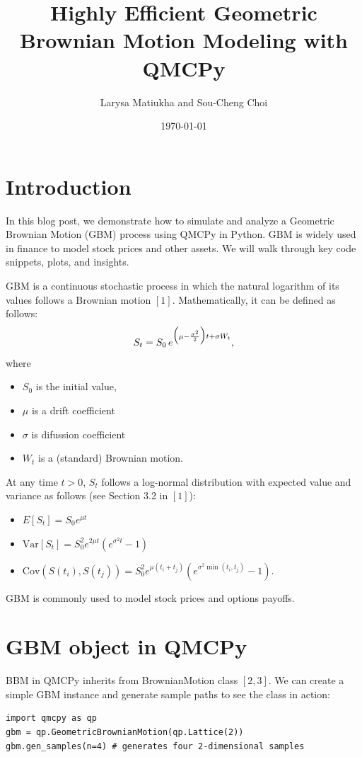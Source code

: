 \documentclass{article}
\title{Highly Efficient Geometric Brownian Motion Modeling with QMCPy}
\author{Larysa Matiukha and Sou-Cheng Choi}
\date{\today}
\begin{document}
\maketitle

\section{Introduction}

In this blog post, we demonstrate how to simulate and analyze a Geometric Brownian Motion (GBM) process using QMCPy in Python.
GBM is widely used in finance to model stock prices and other assets. 
We will walk through key code snippets, plots, and insights.

GBM is a continuous stochastic process in which the natural logarithm of its values follows a Brownian motion $[1]$.
Mathematically, it can be defined as follows:
$$\large{S_t = S_0 \, e^{\big(\mu - \frac{\sigma^2}{2}\big)  t + \sigma W_t}}, \label{gbm}$$
where
\begin{itemize}
\item $S_0$ is the initial value, 
\item $\mu$ is a drift coefficient
\item  $\sigma$ is difussion coefficient  
\item  $W_t$ is a (standard) Brownian motion.
\end{itemize}

At any time $t > 0$, $S_t$ follows a log-normal distribution with expected value and variance as follows (see Section 3.2 in $[1]$):
\begin{itemize}
\item
 $E[S_t] = S_0 e^{\mu t}$
\item $\text{Var}[S_t] = S_0^2 e^{2\mu t}(e^{\sigma^2 t} - 1)$
\item   $  
    \text{Cov}(S(t_i), S(t_j)) = S_0^2 e^{\mu(t_i + t_j)} \left(e^{\sigma^2 \min(t_i, t_j)} - 1\right).$
\end{itemize}


GBM is commonly used to model stock prices and options payoffs. 

\section{GBM object in QMCPy}

BBM in QMCPy inherits from BrownianMotion class $[2, 3]$. 
We can create a simple GBM instance and generate sample paths to see the class in action:
\begin{verbatim}
import qmcpy as qp
gbm = qp.GeometricBrownianMotion(qp.Lattice(2)) 
gbm.gen_samples(n=4) # generates four 2-dimensional samples
\end{verbatim}
\end{document}
